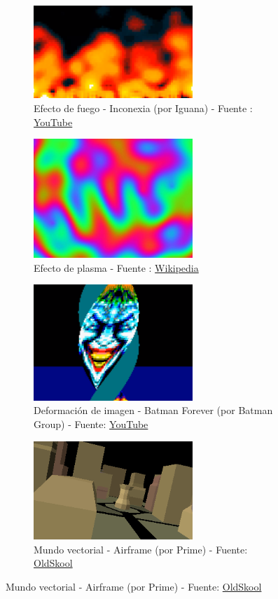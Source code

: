 \begin{figure}[h]
	\centering
	\begin{subfigure}[b]{0.45\textwidth}
		\centering
		\includegraphics[width=6cm]{archivos/fire_inconexia}
		\caption{Efecto de fuego - Inconexia (por Iguana) - Fuente : \href{https://www.youtube.com/watch?v=ztxbEbUa4YY}{YouTube}}
		\label{fig:fire_inconexia}
	\end{subfigure}
	\begin{subfigure}[b]{0.45\textwidth}
		\centering
		\includegraphics[width=6cm]{archivos/plasma}
		\caption{Efecto de plasma - Fuente : \href{https://en.wikipedia.org/wiki/Plasma_effect\#/media/File:Plasma_effect.jpg}{Wikipedia}}
		\label{fig:plasma}
	\end{subfigure}
	\begin{subfigure}[b]{0.45\textwidth}
		\centering
		\includegraphics[width=6cm]{archivos/deformaciones}
		\caption{Deformación de imagen - Batman Forever (por Batman Group) - Fuente: \href{https://www.youtube.com/watch?v=YJosZfm560Q}{YouTube}}
		\label{fig:deformaciones}
	\end{subfigure}
	\begin{subfigure}[b]{0.45\textwidth}
		\centering
		\includegraphics[width=6cm]{archivos/vectorworld}
		\caption{Mundo vectorial - Airframe (por Prime) - Fuente: \href{http://www.oldskool.org/demos/explained/htmlpictures/vectorw.gif}{OldSkool}}
		\label{fig:vectorworld}
	\end{subfigure}
\end{figure}



